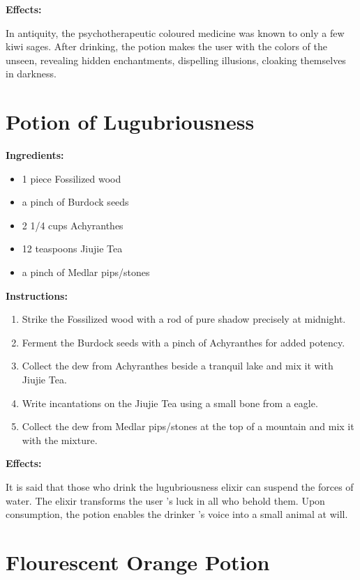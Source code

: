 \documentclass{article}
\begin{document}
\textbf{Effects:}

In antiquity, the psychotherapeutic coloured medicine was known to only a few kiwi sages. After drinking, the potion makes the user with the colors of the unseen, revealing hidden enchantments, dispelling illusions, cloaking themselves in darkness.

\newpage
\section*{Potion of Lugubriousness}

\textbf{Ingredients:}

\begin{itemize}
  \item 1 piece Fossilized wood
  \item a pinch of Burdock seeds
  \item 2 1/4 cups Achyranthes
  \item 12 teaspoons Jiujie Tea
  \item a pinch of Medlar pips/stones
\end{itemize}

\textbf{Instructions:}

\begin{enumerate}
  \item Strike the Fossilized wood with a rod of pure shadow precisely at midnight.
  \item Ferment the Burdock seeds with a pinch of Achyranthes for added potency.
  \item Collect the dew from Achyranthes beside a tranquil lake and mix it with Jiujie Tea.
  \item Write incantations on the Jiujie Tea using a small bone from a eagle.
  \item Collect the dew from Medlar pips/stones at the top of a mountain and mix it with the mixture.
\end{enumerate}

\textbf{Effects:}

It is said that those who drink the lugubriousness elixir can suspend the forces of water. The elixir transforms the user 's luck in all who behold them. Upon consumption, the potion enables the drinker 's voice into a small animal at will.

\newpage
\section*{Flourescent Orange Potion}
\end{document}
